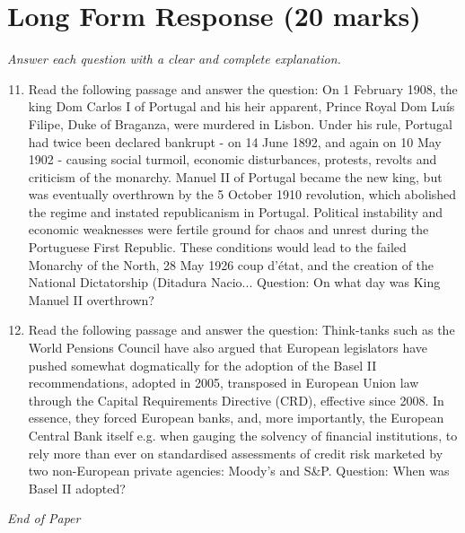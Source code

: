 \documentclass[12pt]{article}
\begin{document}
\section*{Long Form Response (20 marks)}
\textit{Answer each question with a clear and complete explanation.}
\begin{enumerate}[label=\arabic*.]
\setcounter{enumi}{10}
\item Read the following passage and answer the question: On 1 February 1908, the king Dom Carlos I of Portugal and his heir apparent, Prince Royal Dom Luís Filipe, Duke of Braganza, were murdered in Lisbon. Under his rule, Portugal had twice been declared bankrupt - on 14 June 1892, and again on 10 May 1902 - causing social turmoil, economic disturbances, protests, revolts and criticism of the monarchy. Manuel II of Portugal became the new king, but was eventually overthrown by the 5 October 1910 revolution, which abolished the regime and instated republicanism in Portugal. Political instability and economic weaknesses were fertile ground for chaos and unrest during the Portuguese First Republic. These conditions would lead to the failed Monarchy of the North, 28 May 1926 coup d'état, and the creation of the National Dictatorship (Ditadura Nacio... Question: On what day was King Manuel II overthrown?
\item Read the following passage and answer the question: Think-tanks such as the World Pensions Council have also argued that European legislators have pushed somewhat dogmatically for the adoption of the Basel II recommendations, adopted in 2005, transposed in European Union law through the Capital Requirements Directive (CRD), effective since 2008. In essence, they forced European banks, and, more importantly, the European Central Bank itself e.g. when gauging the solvency of financial institutions, to rely more than ever on standardised assessments of credit risk marketed by two non-European private agencies: Moody's and S\&P. Question: When was Basel II adopted?
\end{enumerate}

\vfill
\noindent\textit{End of Paper}
\end{document}
